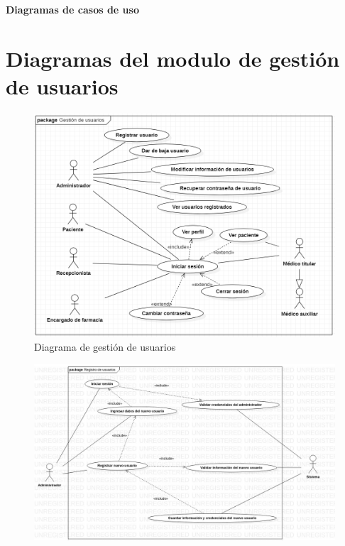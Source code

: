 \documentclass[12pt,letterpaper]{article}
\begin{document}
    \newpage
	\pagestyle{plain}
	{
		\begin{center}
			\par\vspace{0.5cm}
			{
				\Huge\textbf
				{
					Diagramas de casos de uso
				}
			}
        \end{center}
    \section{Diagramas del modulo de gestión de usuarios}
        \begin{figure}[H]
            \centering
            \includegraphics [scale=0.5]{gestionUsuarios}
            \caption{Diagrama de gestión de usuarios}
        \end{figure}
        \begin{figure}[H]
            \centering
            \includegraphics [scale=0.35]{alta_usuarios}

\end{figure}}
\end{document}
